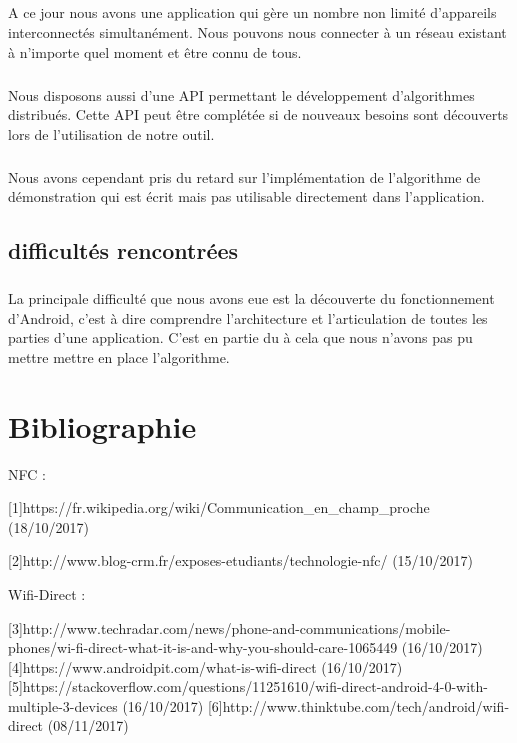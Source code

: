 \documentclass[a4paper,10pt]{report}
\begin{document}
\paragraph{}
A ce jour nous avons une application qui gère un nombre non limité d'appareils interconnectés simultanément. Nous pouvons nous connecter à un réseau existant à n'importe quel moment et être connu de tous.
\paragraph{}
Nous disposons aussi d'une API permettant le développement d'algorithmes distribués. Cette API peut être complétée si de nouveaux besoins sont découverts lors de l'utilisation de notre outil.
\paragraph{}
Nous avons cependant pris du retard sur l'implémentation de l'algorithme de démonstration qui est écrit mais pas utilisable directement dans l'application.
\paragraph{}
\section{difficultés rencontrées}
\paragraph{}
La principale difficulté que nous avons eue est la découverte du fonctionnement d'Android, c'est à dire comprendre l'architecture et l'articulation de toutes les parties d'une application. C'est en partie du à cela que nous n'avons pas pu mettre mettre en place l'algorithme.
\chapter*{Bibliographie}
\sloppy
 NFC :
 
 [1]https://fr.wikipedia.org/wiki/Communication_en_champ_proche
 (18/10/2017)
 
 [2]http://www.blog-crm.fr/exposes-etudiants/technologie-nfc/
 (15/10/2017)
 
 
\newline
 Wifi-Direct :

 [3]http://www.techradar.com/news/phone-and-communications/mobile-phones/wi-fi-direct-what-it-is-and-why-you-should-care-1065449 (16/10/2017)
 [4]https://www.androidpit.com/what-is-wifi-direct (16/10/2017)
 [5]https://stackoverflow.com/questions/11251610/wifi-direct-android-4-0-with-multiple-3-devices (16/10/2017)
 [6]http://www.thinktube.com/tech/android/wifi-direct (08/11/2017)
 
\end{document}
